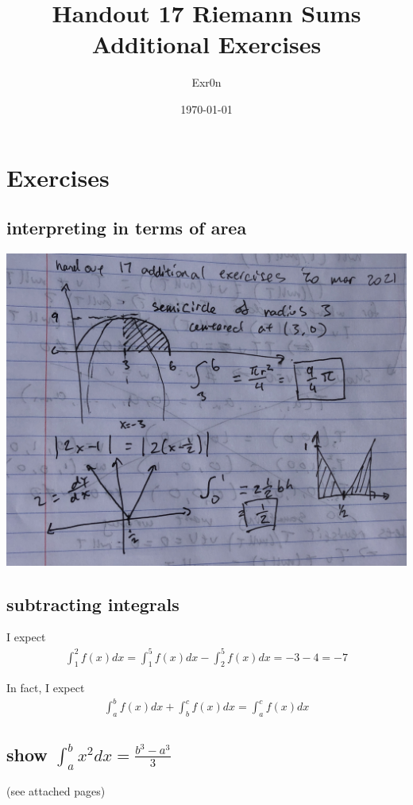 \documentclass[letterpaper]{article}
\author{Exr0n}
\date{\today}
\title{Handout 17 Riemann Sums Additional Exercises}
\renewcommand\maketitle{}
\begin{document}
\maketitle
\section{Exercises}
\label{sec:orgbc13466}
\subsection{interpreting in terms of area}
\label{sec:orge34f05f}
\begin{center}
\includegraphics[width=.9\linewidth]{./KBe21math401srcHandout17AdditionalExercises.jpg}
\end{center}

\setcounter{subsection}{2}

\subsection{subtracting integrals}
\label{sec:org0cb7d86}
I expect
\[\begin{aligned}
   \int_1^2f(x)dx = \int_1^5f(x)dx - \int_2^5f(x)dx = -3-4 = -7
   \end{aligned}\]

In fact, I expect
\[\begin{aligned}
   \int_a^bf(x)dx + \int_b^cf(x)dx = \int_a^cf(x)dx
   \end{aligned}\]
\subsection{show \(\int_a^b x^2dx = \frac{b^3-a^3}{3}\)}
\label{sec:org2bae6c2}
(see attached pages)
\end{document}
